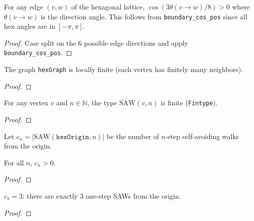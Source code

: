 \begin{lemma}\label{lem:hex_dir_cos}
\leanok
{}
  For any edge $(v,w)$ of the hexagonal lattice,
  $\cos(3\theta(v{\to}w)/8) > 0$ where $\theta(v{\to}w)$ is the
  direction angle. This follows from \texttt{boundary\_cos\_pos}
  since all hex angles are in $[-\pi,\pi]$.
\end{lemma}
\begin{proof}
\leanok
  Case split on the 6 possible edge directions and apply
  \texttt{boundary\_cos\_pos}.
\end{proof}

\begin{lemma}\label{lem:locally_finite}
\leanok
{}
  The graph \texttt{hexGraph} is locally finite (each vertex has finitely many neighbors).
\end{lemma}
\begin{proof}
\leanok
\end{proof}

\begin{lemma}\label{lem:saw_finite}
\leanok
{}
  For any vertex $v$ and $n \in \mathbb{N}$, the type $\mathrm{SAW}(v, n)$ is finite
  (\texttt{Fintype}).
\end{lemma}
\begin{proof}
\leanok
\end{proof}

\begin{definition}\label{def:saw_count}
\leanok
{}
  Let $c_n = |\mathrm{SAW}(\texttt{hexOrigin}, n)|$ be the number of $n$-step
  self-avoiding walks from the origin.
\end{definition}

\begin{lemma}\label{lem:saw_count_pos}
\leanok
{}
  For all $n$, $c_n > 0$.
\end{lemma}
\begin{proof}
\leanok
\end{proof}

\begin{lemma}[SAW count $c_1 = 3$]\label{lem:saw_count_one}
\leanok
{}
  $c_1 = 3$: there are exactly $3$ one-step SAWs from the origin.
\end{lemma}
\begin{proof}
\leanok
\end{proof}

